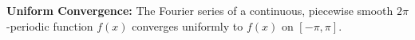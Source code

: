 {\bf Uniform Convergence:} The Fourier series of a continuous, piecewise smooth $2\pi$-periodic function $f(x)$ converges uniformly to $f(x)$ on $[-\pi,\pi]$.
